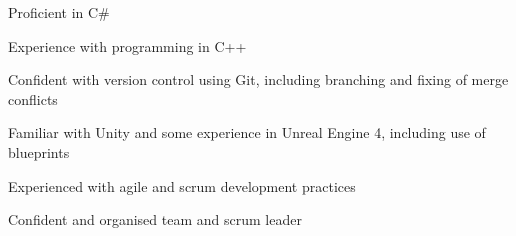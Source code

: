 


\begin{cvparagraph}
    
    \begin{cvitems}
        \text{}
        \item
        \item Proficient in C\# 
        \item Experience with programming in C++
        \item Confident with version control using Git, including branching and fixing of merge conflicts
        \item Familiar with Unity and some experience in Unreal Engine 4, including use of blueprints
        \item Experienced with agile and scrum development practices
        \item Confident and organised team and scrum leader
    \end{cvitems}

\end{cvparagraph}